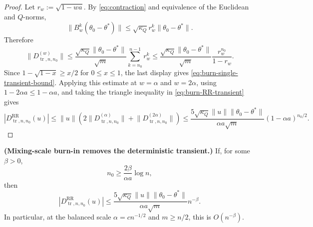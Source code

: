 \begin{proof} Let $r_{w} := \sqrt{1 - w a}$. By \eqref{eq:contraction} and equivalence of the
Euclidean and $Q$-norms,
\[
\lVert B_{w}^{k} (\theta_{0} - \theta^{*}) \rVert
  \le \sqrt{\kappa_{Q}} r_{w}^{k} \lVert \theta_{0} - \theta^{*} \rVert.
\]
Therefore
\[
\lVert D_{\operatorname{tr}, n, n_{0}}^{(w)} \rVert
  \le \frac{\sqrt{\kappa_{Q}} \lVert \theta_{0} - \theta^{*} \rVert}{\sqrt{m}}
     \sum_{k = n_{0}}^{n - 1} r_{w}^{k}
  \le \frac{\sqrt{\kappa_{Q}} \lVert \theta_{0} - \theta^{*} \rVert}{\sqrt{m}}
     \frac{r_{w}^{n_{0}}}{1 - r_{w}}.
\]
Since $1 - \sqrt{1 - x} \ge x / 2$ for $0 \le x \le 1$, the last display gives
\eqref{eq:burn-single-transient-bound}. Applying this estimate at $w = \alpha$ and
$w = 2 \alpha$, using $1 - 2 \alpha a \le 1 - \alpha a$, and taking the
triangle inequality in \eqref{eq:burn-RR-transient} gives
\[
| D_{\operatorname{tr}, n, n_{0}}^{\mathrm{RR}}(u) |
  \le \lVert u \rVert \left( 2 \lVert D_{\operatorname{tr}, n, n_{0}}^{(\alpha)} \rVert
       + \lVert D_{\operatorname{tr}, n, n_{0}}^{(2 \alpha)} \rVert \right)
  \le \frac{5 \sqrt{\kappa_{Q}} \lVert u \rVert \lVert \theta_{0} - \theta^{*} \rVert}{\alpha a \sqrt{m}}
       (1 - \alpha a)^{n_{0} / 2}.
\]
\end{proof}

\begin{corollary}\label{cor:burn-log-transient}
  \textbf{(Mixing-scale burn-in removes the deterministic transient.)}
  If, for some $\beta > 0$,
  \begin{equation}
n_{0} \ge \frac{2 \beta}{\alpha a} \log n,
\label{eq:burn-log-condition}
\end{equation}
  then
  \begin{equation}
| D_{\operatorname{tr}, n, n_{0}}^{\mathrm{RR}}(u) |
    \le \frac{5 \sqrt{\kappa_{Q}} \lVert u \rVert \lVert \theta_{0} - \theta^{*} \rVert}{\alpha a \sqrt{m}} n^{-\beta}.
\label{eq:burn-log-transient-bound}
\end{equation}
  In particular, at the balanced scale $\alpha = c n^{-1 / 2}$ and
  $m \ge n / 2$, this is $O(n^{-\beta})$.
\end{corollary}


